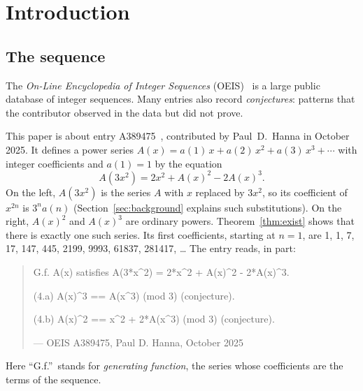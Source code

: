 \documentclass[11pt,a4paper]{article}
\theoremstyle{definition}
\theoremstyle{remark}
\begin{document}
\section{Introduction}

\subsection{The sequence}\label{sec:sequence}
The \emph{On-Line Encyclopedia of Integer Sequences} (OEIS)~\cite{oeisdb} is a large public database of integer
sequences. Many
entries also record \emph{conjectures}: patterns that the contributor observed in the data but did not prove.

This paper is about entry A389475~\cite{oeis}, contributed by Paul~D.~Hanna in October 2025. It defines a power series
$A(x)=a(1)\,x+a(2)\,x^2+a(3)\,x^3+\cdots$ with integer coefficients and $a(1)=1$ by the equation
\begin{equation}\label{eq:oeis}
A(3x^2)=2x^2+A(x)^2-2A(x)^3 .
\end{equation}
On the left, $A(3x^2)$ is the series $A$ with $x$ replaced by $3x^2$, so its coefficient of $x^{2n}$ is $3^n a(n)$
(Section~\ref{sec:background} explains such substitutions). On the right, $A(x)^2$ and $A(x)^3$ are ordinary powers.
Theorem~\ref{thm:exist} shows that there is exactly one such series. Its first coefficients, starting at $n=1$, are
1, 1, 7, 17, 147, 445, 2199, 9993, 61837, 281417, \dots{} The entry reads, in part:
\begin{quote}\small\ttfamily\raggedright G.f. A(x) satisfies A(3*x\^{}2) = 2*x\^{}2 + A(x)\^{}2 - 2*A(x)\^{}3.\par\smallskip (4.a) A(x)\^{}3 == A(x\^{}3) (mod 3) (conjecture).\par\smallskip (4.b) A(x)\^{}2 == x\^{}2 + 2*A(x\^{}3) (mod 3) (conjecture).\par\smallskip\hfill\textrm{--- OEIS A389475, Paul D. Hanna, October 2025}\end{quote}

Here ``G.f.''\ stands for \emph{generating function}, the series whose coefficients are the terms of the sequence.
\end{document}
